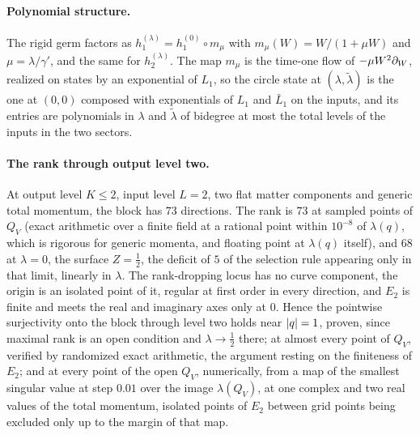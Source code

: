 \paragraph{Polynomial structure.}
The rigid germ factors as $h_1^{(\lambda)} = h_1^{(0)} \circ m_\mu$ with $m_\mu(W) = W / (1 + \mu W)$ and $\mu = \lambda / \gamma'$, and the same for $h_2^{(\lambda)}$.
The map $m_\mu$ is the time-one flow of $- \mu W^2 \partial_W$, realized on states by an exponential of $L_1$, so the circle state at $(\lambda, \tilde\lambda)$ is the one at $(0, 0)$ composed with exponentials of $L_1$ and $\bar L_1$ on the inputs, and its entries are polynomials in $\lambda$ and $\tilde\lambda$ of bidegree at most the total levels of the inputs in the two sectors.

\paragraph{The rank through output level two.}
At output level $K \leq 2$, input level $L = 2$, two flat matter components and generic total momentum, the block has $73$ directions.
The rank is $73$ at sampled points of $Q_V$ (exact arithmetic over a finite field at a rational point within $10^{-8}$ of $\lambda(q)$, which is rigorous for generic momenta, and floating point at $\lambda(q)$ itself), and $68$ at $\lambda = 0$, the surface $Z = \tfrac{1}{2}$, the deficit of $5$ of the selection rule appearing only in that limit, linearly in $\lambda$.
The rank-dropping locus has no curve component, the origin is an isolated point of it, regular at first order in every direction, and $E_2$ is finite and meets the real and imaginary axes only at $0$.
Hence the pointwise surjectivity onto the block through level two holds near ${|q|} = 1$, proven, since maximal rank is an open condition and $\lambda \to \tfrac{1}{2}$ there; at almost every point of $Q_V$, verified by randomized exact arithmetic, the argument resting on the finiteness of $E_2$; and at every point of the open $Q_V$, numerically, from a map of the smallest singular value at step $0.01$ over the image $\lambda(Q_V)$, at one complex and two real values of the total momentum, isolated points of $E_2$ between grid points being excluded only up to the margin of that map.

